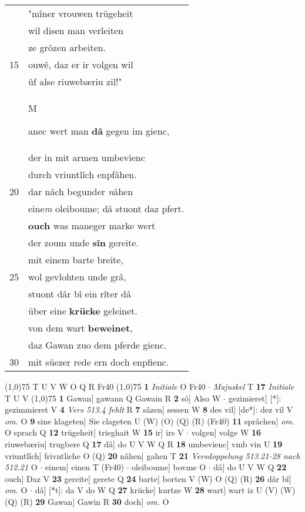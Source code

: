 \documentclass[8pt,a4paper,notitlepage]{article}
\begin{document}
\begin{table}[ht]
\begin{minipage}[t]{0.5\linewidth}
\begin{tabular}{rl}
 & "mîner vrouwen trügeheit\\ 
 & wil disen man verleiten\\ 
 & ze grôzen arbeiten.\\ 
15 & ouwê, daz er ir volgen wil\\ 
 & ûf alse riuwebæriu zil!"\\ 
 & \begin{large}M\end{large}anec wert man \textbf{dâ} gegen im gienc,\\ 
 & der in mit armen umbevienc\\ 
 & durch vriuntlîch enpfâhen.\\ 
20 & dar nâch begunder \textit{n}âhen\\ 
 & eine\textit{m} oleiboume; dâ stuont daz pfert.\\ 
 & \textbf{ouch} was maneger marke wert\\ 
 & der zoum unde \textbf{sîn} gereite.\\ 
 & mit einem barte breite,\\ 
25 & wol gevlohten unde grâ,\\ 
 & stuont dâr bî ein rîter dâ\\ 
 & über eine \textbf{krücke} geleinet.\\ 
 & von dem wart \textbf{beweinet},\\ 
 & daz Gawan zuo dem pferde gienc.\\ 
30 & mit süezer rede ern doch enpfienc.\\ 
\end{tabular}
\scriptsize
\line(1,0){75} \newline
T U V W O Q R Fr40 \newline
\line(1,0){75} \newline
\textbf{1} \textit{Initiale} O Fr40   $\cdot$ \textit{Majuskel} T  \textbf{17} \textit{Initiale} T U V  \newline
\line(1,0){75} \newline
\textbf{1} Gawan] gawann Q Gawain R \textbf{2} sô] Also W  $\cdot$ gezimieret] [*]: gezimmieret V \textbf{4} \textit{Vers 513.4 fehlt} R  \textbf{7} sâzen] sessen W \textbf{8} des vil] [de*]: dez vil V \textit{om.} O \textbf{9} sine klageten] Sie clageten U (W) (O) (Q) (R) (Fr40) \textbf{11} sprâchen] \textit{om.} O sprach Q \textbf{12} trügeheit] trieghait W \textbf{15} ir] irs V  $\cdot$ volgen] volge W \textbf{16} riuwebæriu] trugbere Q \textbf{17} dâ] do U V W Q R \textbf{18} umbevienc] vmb vin U \textbf{19} vriuntlîch] frivntliche O (Q) \textbf{20} nâhen] gahen T \textbf{21} \textit{Versdoppelung 513.21-28 nach 512.21} O   $\cdot$ einem] einen T (Fr40)  $\cdot$ oleiboume] bovme O  $\cdot$ dâ] do U V W Q \textbf{22} ouch] Daz V \textbf{23} gereite] gerete Q \textbf{24} barte] borten V (W) O (Q) (R) \textbf{26} dâr bî] \textit{om.} O  $\cdot$ dâ] [*t]: da V do W Q \textbf{27} krücke] kurtze W \textbf{28} wart] wart iz U (V) (W) (Q) (R) \textbf{29} Gawan] Gawin R \textbf{30} doch] \textit{om.} O \newline
\end{minipage}
\end{table}
\end{document}
